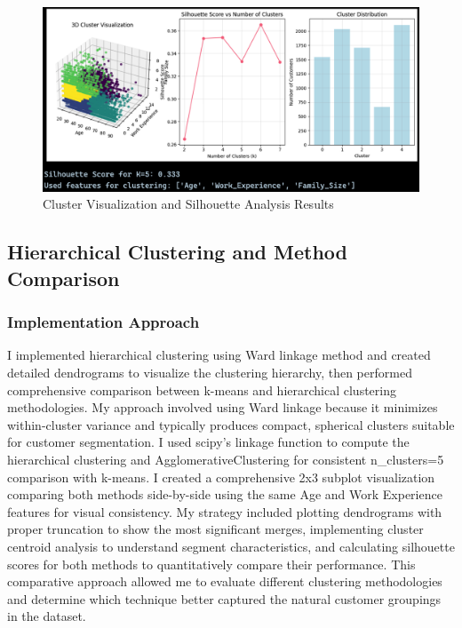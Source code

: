 \documentclass[12pt,a4paper]{article}
\begin{document}
\begin{figure}[htbp]
\centering
\includegraphics[width=\textwidth]{Figures/plot_sylhoutte.png}
\caption{Cluster Visualization and Silhouette Analysis Results}
\end{figure}

\subsection{Hierarchical Clustering and Method Comparison}

\subsubsection{Implementation Approach}
I implemented hierarchical clustering using Ward linkage method and created detailed dendrograms to visualize the clustering hierarchy, then performed comprehensive comparison between k-means and hierarchical clustering methodologies. My approach involved using Ward linkage because it minimizes within-cluster variance and typically produces compact, spherical clusters suitable for customer segmentation. I used scipy's linkage function to compute the hierarchical clustering and AgglomerativeClustering for consistent n\_clusters=5 comparison with k-means. I created a comprehensive 2x3 subplot visualization comparing both methods side-by-side using the same Age and Work Experience features for visual consistency. My strategy included plotting dendrograms with proper truncation to show the most significant merges, implementing cluster centroid analysis to understand segment characteristics, and calculating silhouette scores for both methods to quantitatively compare their performance. This comparative approach allowed me to evaluate different clustering methodologies and determine which technique better captured the natural customer groupings in the dataset.
\end{document}

